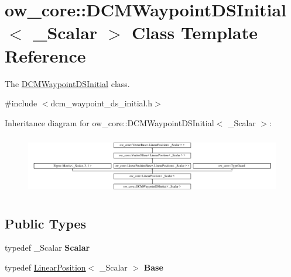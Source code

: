 \hypertarget{classow__core_1_1DCMWaypointDSInitial}{}\section{ow\+\_\+core\+:\+:D\+C\+M\+Waypoint\+D\+S\+Initial$<$ \+\_\+\+Scalar $>$ Class Template Reference}
\label{classow__core_1_1DCMWaypointDSInitial}


The \hyperlink{classow__core_1_1DCMWaypointDSInitial}{D\+C\+M\+Waypoint\+D\+S\+Initial} class.  




{\ttfamily \#include $<$dcm\+\_\+waypoint\+\_\+ds\+\_\+initial.\+h$>$}

Inheritance diagram for ow\+\_\+core\+:\+:D\+C\+M\+Waypoint\+D\+S\+Initial$<$ \+\_\+\+Scalar $>$\+:\begin{figure}[H]
\begin{center}
\leavevmode
\includegraphics[height=2.629108cm]{d7/d05/classow__core_1_1DCMWaypointDSInitial}
\end{center}
\end{figure}
\subsection*{Public Types}
\begin{DoxyCompactItemize}
\item 
typedef \+\_\+\+Scalar {\bfseries Scalar}\hypertarget{classow__core_1_1DCMWaypointDSInitial_a2f75ef0142c79ef73251f7b723ae5bc8}{}\label{classow__core_1_1DCMWaypointDSInitial_a2f75ef0142c79ef73251f7b723ae5bc8}

\item 
typedef \hyperlink{classow__core_1_1LinearPosition}{Linear\+Position}$<$ \+\_\+\+Scalar $>$ {\bfseries Base}\hypertarget{classow__core_1_1DCMWaypointDSInitial_aeb7973ffe84ff6b4717425a90639a798}{}\label{classow__core_1_1DCMWaypointDSInitial_aeb7973ffe84ff6b4717425a90639a798}

\end{DoxyCompactItemize}
